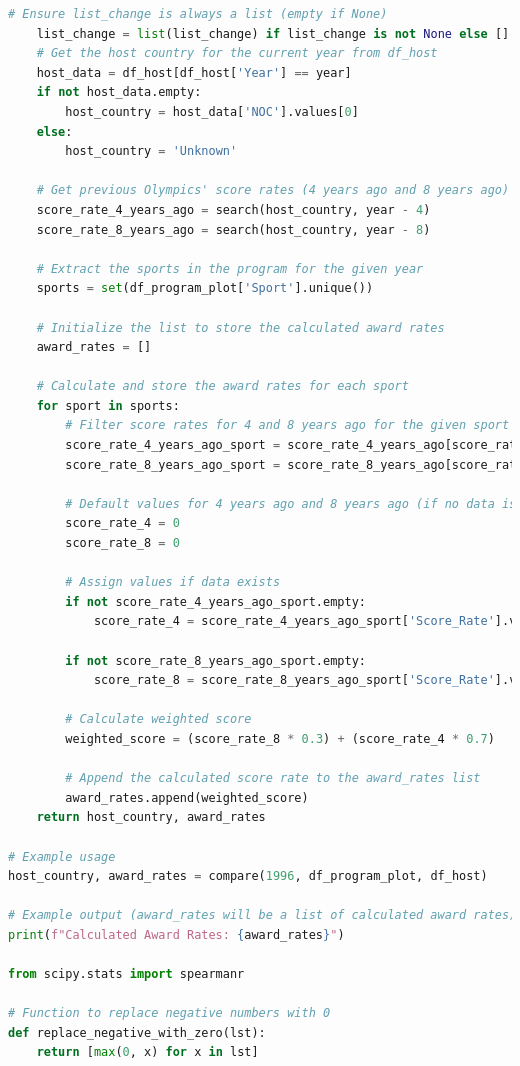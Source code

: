 \documentclass[12pt]{article}
\begin{document}
\begin{lstlisting}[language=Python, style=mystyle, caption=data\_analyze.ipynb]
    # Ensure list_change is always a list (empty if None)
    list_change = list(list_change) if list_change is not None else []
    # Get the host country for the current year from df_host
    host_data = df_host[df_host['Year'] == year]
    if not host_data.empty:
        host_country = host_data['NOC'].values[0]
    else:
        host_country = 'Unknown'
    
    # Get previous Olympics' score rates (4 years ago and 8 years ago)
    score_rate_4_years_ago = search(host_country, year - 4)
    score_rate_8_years_ago = search(host_country, year - 8)

    # Extract the sports in the program for the given year
    sports = set(df_program_plot['Sport'].unique())

    # Initialize the list to store the calculated award rates
    award_rates = []

    # Calculate and store the award rates for each sport
    for sport in sports:
        # Filter score rates for 4 and 8 years ago for the given sport
        score_rate_4_years_ago_sport = score_rate_4_years_ago[score_rate_4_years_ago['Sport'] == sport]
        score_rate_8_years_ago_sport = score_rate_8_years_ago[score_rate_8_years_ago['Sport'] == sport]

        # Default values for 4 years ago and 8 years ago (if no data is available)
        score_rate_4 = 0
        score_rate_8 = 0

        # Assign values if data exists
        if not score_rate_4_years_ago_sport.empty:
            score_rate_4 = score_rate_4_years_ago_sport['Score_Rate'].values[0]

        if not score_rate_8_years_ago_sport.empty:
            score_rate_8 = score_rate_8_years_ago_sport['Score_Rate'].values[0]

        # Calculate weighted score 
        weighted_score = (score_rate_8 * 0.3) + (score_rate_4 * 0.7)

        # Append the calculated score rate to the award_rates list
        award_rates.append(weighted_score)
    return host_country, award_rates

# Example usage
host_country, award_rates = compare(1996, df_program_plot, df_host)

# Example output (award_rates will be a list of calculated award rates)
print(f"Calculated Award Rates: {award_rates}")

from scipy.stats import spearmanr

# Function to replace negative numbers with 0
def replace_negative_with_zero(lst):
    return [max(0, x) for x in lst]


\end{lstlisting}
\end{document}
